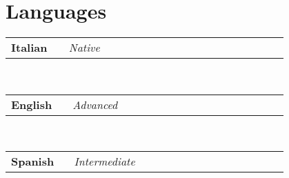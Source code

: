 \newcommand{\lang}[2]
  {\small \color{maincolor}
    \begin{tabular}{@{} p{0.16\linewidth} p{0.64\linewidth}}
      \textbf{\color{hlcolor-0} #1} & \emph{\color{maincolor} #2}
    \end{tabular}}


\section*{Languages}
\begin{cvcontent}
  \lang{Italian}{Native}\\ [0.5mm]
  \lang{English}{Advanced}\\ [0.5mm]
  \lang{Spanish}{Intermediate}
\end{cvcontent}